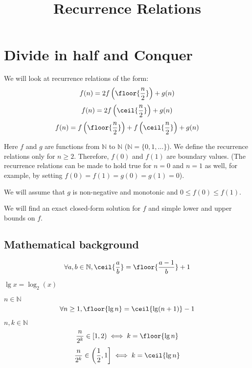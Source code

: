 

\title{Recurrence Relations}



\maketitle

\initAfterBeginDocument{}

\section{Divide in half and Conquer}

We will look at recurrence relations of the form:
\[ f(n) = 2f\left(\floor{\frac{n}{2}}\right) + g(n) \]
\[ f(n) = 2f\left(\ceil{\frac{n}{2}}\right) + g(n) \]
\[ f(n) = f\left(\floor{\frac{n}{2}}\right) + f\left(\ceil{\frac{n}{2}}\right) + g(n) \]

Here $f$ and $g$ are functions from $\mathbb{N}$ to $\mathbb{N}$ ($\mathbb{N} = \{0, 1, \ldots\}$).
We define the recurrence relations only for $n \ge 2$.
Therefore, $f(0)$ and $f(1)$ are boundary values.
(The recurrence relations can be made to hold true for $n=0$ and $n=1$ as well,
for example, by setting $f(0) = f(1) = g(0) = g(1) = 0$).

We will assume that $g$ is non-negative and monotonic and $0 \le f(0) \le f(1)$.

We will find an exact closed-form solution for $f$ and simple lower and upper bounds on $f$.

\subsection{Mathematical background}

\begin{lemma}
\[ \forall a, b \in \mathbb{N}, \ceil{\frac{a}{b}} = \floor{\frac{a-1}{b}} + 1 \]
\end{lemma}
\begin{definition}$\lg{x} = \log_2(x)$\end{definition}
\begin{lemma} $n \in \mathbb{N}$
\[\forall n \ge 1, \floor{\lg n} = \ceil{\lg(n+1)} - 1 \]
\end{lemma}

\begin{lemma} $n, k \in \mathbb{N}$
\[ \frac{n}{2^k} \in \left[1, 2\right) \iff k = \floor{\lg n} \]
\[ \frac{n}{2^k} \in \left(\frac{1}{2}, 1\right] \iff k = \ceil{\lg n} \]
\end{lemma}

